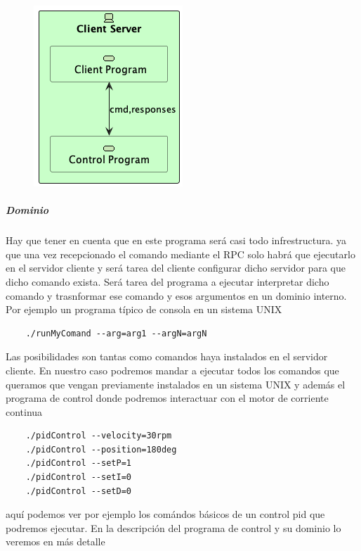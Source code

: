 \begin{figure}[H]
    \centering
    \includegraphics[height=0.3\textheight]{./part/Proyecto_ejecutivo/memoria_descriptiva/descripcionDelProyecto/client/uml/clientServerConcept}
    \caption[Diagrama componentes]{}\label{fig:clientServerConcept}
\end{figure}

\subparagraph{Dominio}

Hay que tener en cuenta que en este programa será casi todo infrestructura. ya que una vez recepcionado el comando mediante el RPC
solo habrá que ejecutarlo en el servidor cliente y será tarea del cliente configurar dicho servidor para que dicho comando exista. Será tarea del programa a ejecutar interpretar dicho comando y trasnformar ese comando y esos argumentos en un dominio interno. Por ejemplo un programa típico de consola en un sistema UNIX

\begin{verbatim}
    ./runMyComand --arg=arg1 --argN=argN
\end{verbatim}


Las posibilidades son tantas como comandos haya instalados en el servidor cliente. En nuestro caso podremos mandar a ejecutar todos los comandos que queramos que vengan previamente instalados en un sistema UNIX y además el programa de control donde podremos interactuar con el motor de corriente continua

\begin{verbatim}
    ./pidControl --velocity=30rpm
    ./pidControl --position=180deg
    ./pidControl --setP=1
    ./pidControl --setI=0
    ./pidControl --setD=0
\end{verbatim}

aquí podemos ver por ejemplo los comándos básicos de un control pid que podremos ejecutar. En la descripción del programa de control y su dominio lo veremos en más detalle


